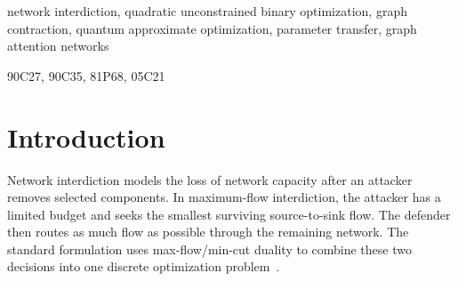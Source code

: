 \documentclass[review,onefignum,onetabnum]{siamart171218}
\begin{document}
\maketitle

\begin{abstract}
Maximum-flow network interdiction selects arcs for removal to reduce the flow between a source and a sink.
We study a quadratic unconstrained binary optimization (QUBO) formulation and a decomposition method for this problem.
The QUBO uses a linear budget term and a quadratic penalty for the cut constraints.
We derive an exact interval for the budget multiplier and a sufficient condition for the cut penalty.
The interval can be empty, so a large multiplier does not always recover the required budget.
We then reduce each piece by an exact contraction of its fixed surroundings.
Budget allocation and repeated piece solves provide a heuristic for the full network.
For the quantum approximate optimization algorithm (QAOA), we compare fixed parameters, two parameter-transfer rules, target-specific training, and a regularized warm start.
A completed statevector experiment uses 12 training graphs and six separate test graphs, with up to 21 qubits.
At depth two, the regularized warm start closes 0.861 of the uniform-to-ground energy gap on average.
The fixed-parameter baseline closes 0.653.
However, energy and optimal-interdiction probability give different rankings, and greedy search solves every test graph exactly.
These results support a reproducible study of formulation and transfer behavior.
They do not establish an advantage on hard interdiction problems.
\end{abstract}

\begin{keywords}
network interdiction, quadratic unconstrained binary optimization, graph contraction,
quantum approximate optimization, parameter transfer, graph attention networks
\end{keywords}
\begin{AMS}
90C27, 90C35, 81P68, 05C21
\end{AMS}

\section{Introduction}\label{sec:introduction}
Network interdiction models the loss of network capacity after an attacker removes selected components.
In maximum-flow interdiction, the attacker has a limited budget and seeks the smallest surviving source-to-sink flow.
The defender then routes as much flow as possible through the remaining network.
The standard formulation uses max-flow/min-cut duality to combine these two decisions into one discrete optimization problem~\cite{wood1993}.
\end{document}
